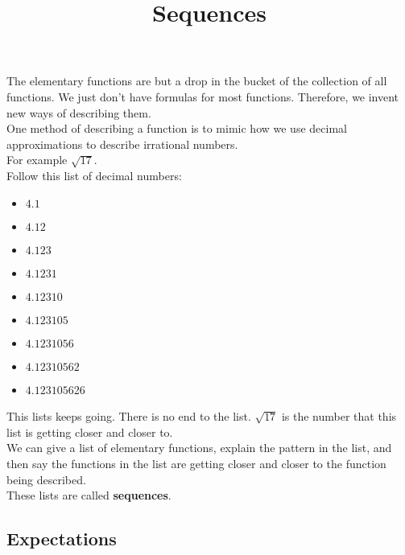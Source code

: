 \documentclass{ximera}
\title{Sequences}
\begin{document}
\begin{abstract}
\end{abstract}

\maketitle





The elementary functions are but a drop in the bucket of the collection of all functions.  We just don't have formulas for most functions.  Therefore, we invent new ways of describing them. \\


One method of describing a function is to mimic how we use decimal approximations to describe irrational numbers. \\


For example $\sqrt{17}$. \\

Follow this list of decimal numbers:


\begin{itemize}
\item $4.1$
\item $4.12$
\item $4.123$
\item $4.1231$
\item $4.12310$
\item $4.123105$
\item $4.1231056$
\item $4.12310562$
\item $4.123105$626
\end{itemize}


This lists keeps going.  There is no end to the list.  $\sqrt{17}$ is the number that this list is getting closer and closer to. \\



We can give a list of elementary functions, explain the pattern in the list, and then say the functions in the list are getting closer and closer to the function being described. \\

These lists are called \textbf{sequences}. \\







\subsection{Expectations}
\end{document}
